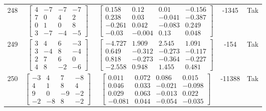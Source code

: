 \documentclass[a4paper,12pt]{article}
\begin{document}
\begin{tabular}{c c c c c}
248
&
$\begin{bmatrix} 4 & -7 & -7 & -7 \\ 7 & 0 & 4 & 2 \\ 0 & 1 & 0 & 8 \\ 3 & -7 & -4 & -5 \end{bmatrix}$
&
$\begin{bmatrix} 0.158 & 0.12 & 0.01 & -0.156 \\ 0.238 & 0.03 & -0.041 & -0.387 \\ -0.261 & 0.042 & -0.083 & 0.249 \\ -0.03 & -0.004 & 0.13 & 0.048 \end{bmatrix}$
&
-1345
&
Tak
\\
249
&
$\begin{bmatrix} 3 & 4 & 6 & -3 \\ 3 & -4 & 8 & -4 \\ 2 & 7 & 6 & 0 \\ 4 & 8 & -2 & -6 \end{bmatrix}$
&
$\begin{bmatrix} -4.727 & 1.909 & 2.545 & 1.091 \\ 0.649 & -0.312 & -0.273 & -0.117 \\ 0.818 & -0.273 & -0.364 & -0.227 \\ -2.558 & 0.948 & 1.455 & 0.481 \end{bmatrix}$
&
-154
&
Tak
\\
250
&
$\begin{bmatrix} -3 & 4 & 7 & -8 \\ 4 & 1 & 8 & 4 \\ 9 & 0 & -9 & -2 \\ -2 & -8 & 8 & -2 \end{bmatrix}$
&
$\begin{bmatrix} 0.011 & 0.072 & 0.086 & 0.015 \\ 0.046 & 0.033 & -0.021 & -0.098 \\ 0.029 & 0.063 & -0.013 & 0.022 \\ -0.081 & 0.044 & -0.054 & -0.035 \end{bmatrix}$
&
-11388
&
Tak
\\
\end{tabular} \egroup \newpage
\end{document}
